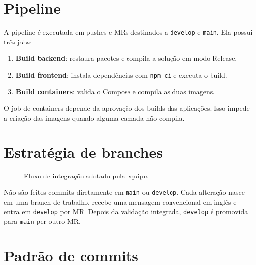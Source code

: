 \documentclass[12pt,a4paper,openany]{report}
\begin{document}
\section{Pipeline}

A pipeline é executada em pushes e MRs destinados a \texttt{develop} e \texttt{main}. Ela possui três jobs:

\begin{enumerate}
  \item \textbf{Build backend}: restaura pacotes e compila a solução em modo Release.
  \item \textbf{Build frontend}: instala dependências com \texttt{npm ci} e executa o build.
  \item \textbf{Build containers}: valida o Compose e compila as duas imagens.
\end{enumerate}

O job de containers depende da aprovação dos builds das aplicações. Isso impede a criação das imagens quando alguma camada não compila.

\section{Estratégia de branches}

\begin{figure}[H]
\centering
{}
\caption{Fluxo de integração adotado pela equipe.}
\end{figure}

Não são feitos commits diretamente em \texttt{main} ou \texttt{develop}. Cada alteração nasce em uma branch de trabalho, recebe uma mensagem convencional em inglês e entra em \texttt{develop} por MR. Depois da validação integrada, \texttt{develop} é promovida para \texttt{main} por outro MR.

\section{Padrão de commits}
\end{document}
